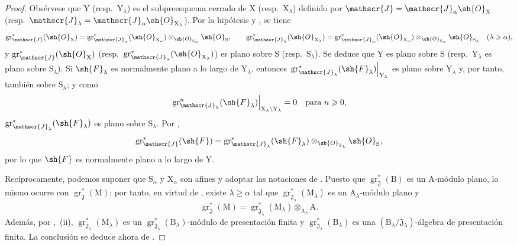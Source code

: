 \begin{proof}
Obsérvese que $\mathrm{Y}$ (resp.\ $\mathrm{Y}_\lambda$) es el subpreesquema cerrado de $\mathrm{X}$ (resp.\ $\mathrm{X}_\lambda$) definido por $\mathscr{J}=\mathscr{J}_\alpha\sh{O}_\mathrm{X}$ (resp.\ $\mathscr{J}_\lambda=\mathscr{J}_\alpha\sh{O}_{\mathrm{X}_\lambda}$). Por la hipótesis y , se tiene
\[
\operatorname{gr}^*_\mathscr{J}(\sh{O}_\mathrm{X})
=\operatorname{gr}^*_{\mathscr{J}_\alpha}(\sh{O}_{\mathrm{X}_\alpha})
 \otimes_{\sh{O}_{\mathrm{S}_\alpha}}\sh{O}_\mathrm{S},
\qquad
\operatorname{gr}^*_{\mathscr{J}_\lambda}(\sh{O}_{\mathrm{X}_\lambda})
=\operatorname{gr}^*_{\mathscr{J}_\alpha}(\sh{O}_{\mathrm{X}_\alpha})
 \otimes_{\sh{O}_{\mathrm{S}_\alpha}}\sh{O}_{\mathrm{S}_\lambda}
\quad(\lambda\geqslant\alpha),
\]
y $\operatorname{gr}^*_\mathscr{J}(\sh{O}_\mathrm{X})$ (resp.\ $\operatorname{gr}^*_{\mathscr{J}_\lambda}(\sh{O}_{\mathrm{X}_\lambda})$) es plano sobre $\mathrm{S}$ (resp.\ $\mathrm{S}_\lambda$). Se deduce que $\mathrm{Y}$ es plano sobre $\mathrm{S}$ (resp.\ $\mathrm{Y}_\lambda$ es plano sobre $\mathrm{S}_\lambda$). Si $\sh{F}_\lambda$ es normalmente plano a lo largo de $\mathrm{Y}_\lambda$, entonces $\left.\operatorname{gr}^*_{\mathscr{J}_\lambda}(\sh{F}_\lambda)\right|_{\mathrm{Y}_\lambda}$ es plano sobre $\mathrm{Y}_\lambda$ y, por tanto, también sobre $\mathrm{S}_\lambda$; y como
\[
\left.\operatorname{gr}^n_{\mathscr{J}_\lambda}(\sh{F}_\lambda)\right|_{\mathrm{X}_\lambda\setminus\mathrm{Y}_\lambda}=0
\quad\text{para }n\geqslant0,
\]
$\operatorname{gr}^*_{\mathscr{J}_\lambda}(\sh{F}_\lambda)$ es plano sobre $\mathrm{S}_\lambda$. Por ,
\[
\operatorname{gr}^*_\mathscr{J}(\sh{F})
=\operatorname{gr}^*_{\mathscr{J}_\lambda}(\sh{F}_\lambda)
 \otimes_{\sh{O}_{\mathrm{S}_\lambda}}\sh{O}_\mathrm{S},
\]
por lo que $\sh{F}$ es normalmente plano a lo largo de $\mathrm{Y}$.

Recíprocamente, podemos suponer que $\mathrm{S}_\alpha$ y $\mathrm{X}_\alpha$ son afines y adoptar las notaciones de . Puesto que $\operatorname{gr}^*_\mathfrak{J}(\mathrm{B})$ es un $\mathrm{A}$-módulo plano, lo mismo ocurre con $\operatorname{gr}^*_\mathfrak{J}(\mathrm{M})$; por tanto, en virtud de , existe $\lambda\geqslant\alpha$ tal que $\operatorname{gr}^*_{\mathfrak{J}_\lambda}(\mathrm{M}_\lambda)$ es un $\mathrm{A}_\lambda$-módulo plano y
\[
\operatorname{gr}^*_\mathfrak{J}(\mathrm{M})
=\operatorname{gr}^*_{\mathfrak{J}_\lambda}(\mathrm{M}_\lambda)
 \otimes_{\mathrm{A}_\lambda}\mathrm{A}.
\]
Además, por ,~(ii), $\operatorname{gr}^*_{\mathfrak{J}_\lambda}(\mathrm{M}_\lambda)$ es un $\operatorname{gr}^*_{\mathfrak{J}_\lambda}(\mathrm{B}_\lambda)$-módulo de presentación finita y $\operatorname{gr}^*_{\mathfrak{J}_\lambda}(\mathrm{B}_\lambda)$ es una $(\mathrm{B}_\lambda/\mathfrak{J}_\lambda)$-álgebra de presentación finita. La conclusión se deduce ahora de .
\end{proof}


